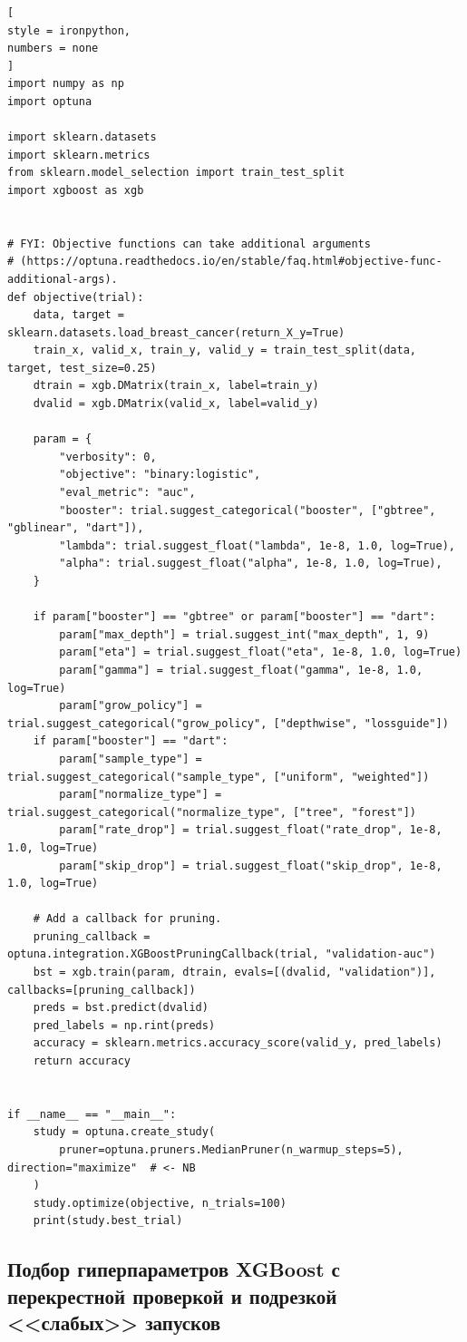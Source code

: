 \documentclass[%
	11pt,
	a4paper,
	utf8,
		]{article}
\begin{document}
\begin{lstlisting}[
style = ironpython,
numbers = none
]
import numpy as np
import optuna

import sklearn.datasets
import sklearn.metrics
from sklearn.model_selection import train_test_split
import xgboost as xgb


# FYI: Objective functions can take additional arguments
# (https://optuna.readthedocs.io/en/stable/faq.html#objective-func-additional-args).
def objective(trial):
	data, target = sklearn.datasets.load_breast_cancer(return_X_y=True)
	train_x, valid_x, train_y, valid_y = train_test_split(data, target, test_size=0.25)
	dtrain = xgb.DMatrix(train_x, label=train_y)
	dvalid = xgb.DMatrix(valid_x, label=valid_y)

	param = {
		"verbosity": 0,
		"objective": "binary:logistic",
		"eval_metric": "auc",
		"booster": trial.suggest_categorical("booster", ["gbtree", "gblinear", "dart"]),
		"lambda": trial.suggest_float("lambda", 1e-8, 1.0, log=True),
		"alpha": trial.suggest_float("alpha", 1e-8, 1.0, log=True),
	}

	if param["booster"] == "gbtree" or param["booster"] == "dart":
		param["max_depth"] = trial.suggest_int("max_depth", 1, 9)
		param["eta"] = trial.suggest_float("eta", 1e-8, 1.0, log=True)
		param["gamma"] = trial.suggest_float("gamma", 1e-8, 1.0, log=True)
		param["grow_policy"] = trial.suggest_categorical("grow_policy", ["depthwise", "lossguide"])
	if param["booster"] == "dart":
		param["sample_type"] = trial.suggest_categorical("sample_type", ["uniform", "weighted"])
		param["normalize_type"] = trial.suggest_categorical("normalize_type", ["tree", "forest"])
		param["rate_drop"] = trial.suggest_float("rate_drop", 1e-8, 1.0, log=True)
		param["skip_drop"] = trial.suggest_float("skip_drop", 1e-8, 1.0, log=True)

	# Add a callback for pruning.
	pruning_callback = optuna.integration.XGBoostPruningCallback(trial, "validation-auc")
	bst = xgb.train(param, dtrain, evals=[(dvalid, "validation")], callbacks=[pruning_callback])
	preds = bst.predict(dvalid)
	pred_labels = np.rint(preds)
	accuracy = sklearn.metrics.accuracy_score(valid_y, pred_labels)
	return accuracy


if __name__ == "__main__":
	study = optuna.create_study(
		pruner=optuna.pruners.MedianPruner(n_warmup_steps=5), direction="maximize"  # <- NB
	)
	study.optimize(objective, n_trials=100)
	print(study.best_trial)
\end{lstlisting}

\subsection{Подбор гиперпараметров XGBoost с перекрестной проверкой и подрезкой <<слабых>> запусков}
\end{document}
